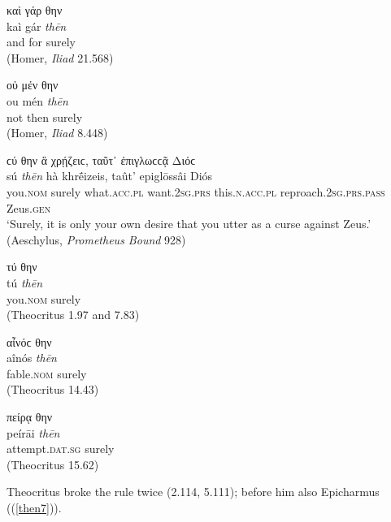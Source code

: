 \begin{exe}
\ex καὶ γάρ θην\\
\gll kaì gár \emph{thēn}\\
and for surely\\
\trans (Homer, \textit{Iliad} 21.568)
\label{then1}
\end{exe}

\begin{exe}
\ex οὐ μέν θην\\
\gll ou mén \emph{thēn}\\
not then surely\\
\trans (Homer, \textit{Iliad} 8.448)
\label{then2}
\end{exe}

\begin{exe}
\ex ϲύ θην ἃ χρῄζειϲ, ταῦτ᾽ ἐπιγλωϲϲᾷ Διόϲ\\
\gll sú \emph{thēn} hà khrḗizeis, taût' epiglōssâi Diós\\
you.\textsc{nom} surely what.\textsc{acc.pl} want.\textsc{2sg.prs}
this.\textsc{n.acc.pl} reproach.\textsc{2sg.prs.pass} Zeus.\textsc{gen}\\
\trans `Surely, it is only your own desire that you utter as a curse against Zeus.' (Aeschylus, \textit{Prometheus Bound} 928)
\label{then3}
\end{exe}

\begin{exe}
\ex τύ θην\\
\gll tú \emph{thēn}\\
you.\textsc{nom} surely\\
\trans (Theocritus 1.97 and 7.83)
\label{then4}
\end{exe}

\begin{exe}
\ex αἶνόϲ θην\\
\gll aînós \emph{thēn}\\
fable.\textsc{nom} surely\\
\trans (Theocritus 14.43)
\label{then5}
\end{exe}

\begin{exe}
\ex πείρᾳ θην\\
\gll peírāi \emph{thēn}\\
attempt.\textsc{dat.sg} surely\\
\trans (Theocritus 15.62)
\label{then6}
\end{exe}

Theocritus broke the rule twice (2.114, 5.111); before him also Epicharmus ((\ref{then7})).

